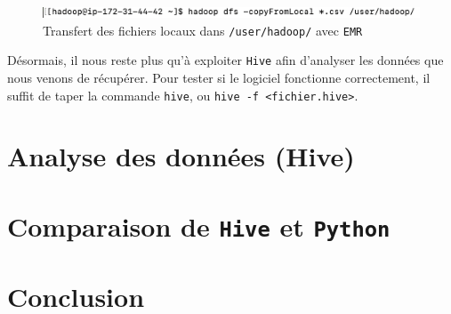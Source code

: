 \documentclass[a4paper, 12pt, oneside]{book}
\begin{document}
\begin{figure}[H]
  \centering
  \includegraphics[width=1.0\textwidth]{images/terminal-fromLocal}
  \caption{Transfert des fichiers locaux dans \texttt{/user/hadoop/} avec \texttt{EMR}}
  \label{fig:terminal-fromLocal}
\end{figure}

Désormais, il nous reste plus qu'à exploiter \texttt{Hive} afin d'analyser les données que nous venons de récupérer. Pour tester si le logiciel fonctionne correctement, il suffit de taper la commande \texttt{hive}, ou \texttt{hive -f <fichier.hive>}.

\chapter{Analyse des données (Hive)}

\chapter{Comparaison de \texttt{Hive} et \texttt{Python}}

\chapter{Conclusion}


% 
\end{document}
